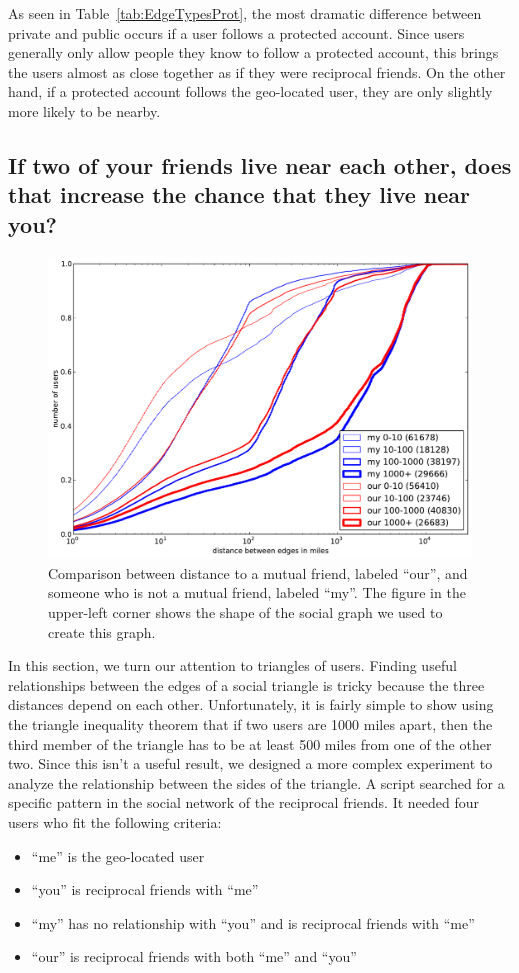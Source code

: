 As seen in Table~\ref{tab:EdgeTypesProt}, the most dramatic difference between
private and public occurs if a user follows a protected account.
%
Since users generally only allow people they know to follow a protected
account, this brings the users almost as close together as if they were
reciprocal friends.
%
On the other hand, if a protected account follows the geo-located user, they
are only slightly more likely to be nearby.

\subsection{If two of your friends live near each other, does that increase the
chance that they live near you?}

\begin{figure}[tb]
\centering
\includegraphics[width=\linewidth]{figures/near_triads.pdf}
\caption{
Comparison between distance to a mutual friend, labeled ``our'', and someone
who is not a mutual friend, labeled ``my''.
The figure in the upper-left corner shows the shape of the social graph we used
to create this graph.
}
\label{fig:NearTriads}
\end{figure}

In this section, we turn our attention to triangles of users.
Finding useful relationships between the edges of a social triangle is tricky
because the three distances depend on each other.
Unfortunately, it is fairly simple to show using the triangle inequality theorem
that if two users are 1000 miles apart, then the third member of the triangle
has to be at least 500 miles from one of the other two.
Since this isn't a useful result, we designed a more complex experiment to
analyze the relationship between the sides of the triangle.
A script searched for a specific pattern in the social network of the
reciprocal friends.  It needed four users who fit the following criteria:
\begin{itemize}
\item ``me'' is the geo-located user
\item ``you'' is reciprocal friends with ``me''
\item ``my'' has no relationship with ``you'' and is reciprocal friends with ``me''
\item ``our'' is reciprocal friends with both ``me'' and ``you''
\end{itemize}


